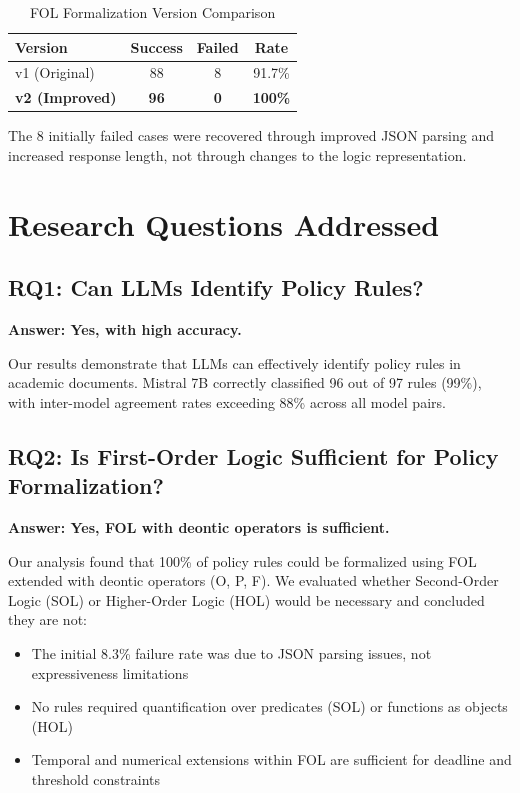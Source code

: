 \begin{table}[h]
\centering
\caption{FOL Formalization Version Comparison}
\label{tab:fol-versions}
\begin{tabular}{|l|c|c|c|}
\hline
\textbf{Version} & \textbf{Success} & \textbf{Failed} & \textbf{Rate} \\
\hline
v1 (Original) & 88 & 8 & 91.7\% \\
\textbf{v2 (Improved)} & \textbf{96} & \textbf{0} & \textbf{100\%} \\
\hline
\end{tabular}
\end{table}

The 8 initially failed cases were recovered through improved JSON parsing and increased response length, not through changes to the logic representation.

\section{Research Questions Addressed}

\subsection{RQ1: Can LLMs Identify Policy Rules?}

\textbf{Answer: Yes, with high accuracy.}

Our results demonstrate that LLMs can effectively identify policy rules in academic documents. Mistral 7B correctly classified 96 out of 97 rules (99\%), with inter-model agreement rates exceeding 88\% across all model pairs.

\subsection{RQ2: Is First-Order Logic Sufficient for Policy Formalization?}

\textbf{Answer: Yes, FOL with deontic operators is sufficient.}

Our analysis found that 100\% of policy rules could be formalized using FOL extended with deontic operators (O, P, F). We evaluated whether Second-Order Logic (SOL) or Higher-Order Logic (HOL) would be necessary and concluded they are not:

\begin{itemize}
    \item The initial 8.3\% failure rate was due to JSON parsing issues, not expressiveness limitations
    \item No rules required quantification over predicates (SOL) or functions as objects (HOL)
    \item Temporal and numerical extensions within FOL are sufficient for deadline and threshold constraints
\end{itemize}

